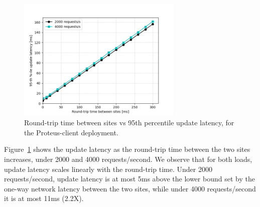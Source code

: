 \begin{figure}[H]
\centering
  \includegraphics[width=0.7\textwidth]{./figures/evaluation/fr_latency_net_latency.png}
  \caption{Round-trip time between sites vs 95th percentile update latency, for the Proteus-client deployment.}
  \label{fig:fr_latency_net_latency}
\end{figure}

Figure~\ref{fig:fr_latency_net_latency} shows the update latency as the round-trip time between the two sites increases,
under 2000 and 4000 requests/second.
We observe that for both loads, update latency scales linearly with the round-trip time.
Under 2000 requests/second, update latency is at most 5ms above the lower bound set by the one-way network latency
between the two sites, while under 4000 requests/second it is at most 11ms (2.2X).

